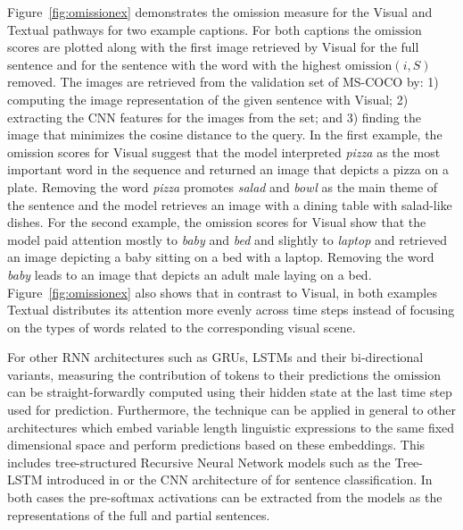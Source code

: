 \noindent Figure~\ref{fig:omissionex} demonstrates the omission
measure for the {\sc Visual} and {\sc Textual} pathways for two
example captions. For both captions the $\mathrm{omission}$ scores are
plotted along with the first image retrieved by {\sc Visual} for the
full sentence and for the sentence with the word with the highest
$\mathrm{omission}(i,S)$ removed. The images are retrieved from the
validation set of MS-COCO by: 1) computing the image representation of the 
given sentence with {\sc Visual}; 2) extracting the CNN features for the 
images from the set; and 3) finding the image that minimizes the cosine distance
to the query.\label{edit:retrievalexplain} 
In the first example, the omission
scores for {\sc Visual} suggest that the model interpreted {\it  pizza} as the most important
word in the sequence and returned an image that depicts a pizza on a plate. 
Removing the word {\it pizza} promotes {\it salad} and {\it bowl} as
the main theme of the sentence and the model retrieves an image with a dining table 
with salad-like dishes. 
For the second example, the omission scores for {\sc
  Visual} show that the model paid attention mostly to {\it baby} and
{\it bed} and slightly to {\it laptop} and retrieved an image depicting a baby 
sitting on a bed with a laptop.
Removing the word {\it baby} leads
to an image that depicts an adult male laying on a bed. Figure~\ref{fig:omissionex}
also shows that in contrast to {\sc Visual}, in both examples {\sc
  Textual} distributes its attention more evenly across time steps
instead of focusing on the types of words related to the corresponding
visual scene.


For other RNN architectures such as GRUs, LSTMs \label{edit:omitgeneral}
and their bi-directional variants, measuring the contribution
of tokens to their predictions the $\mathrm{omission}$ 
can be straight-forwardly computed using their hidden state 
at the last time step used for prediction. Furthermore, the technique 
can be applied in general to other architectures which
embed variable length linguistic expressions to the same fixed dimensional
space and perform predictions based on these embeddings. 
This includes tree-structured Recursive Neural Network models such as the Tree-LSTM
introduced in  or the CNN architecture of  
for sentence classification. In both cases the pre-softmax activations can be extracted 
from the models as the representations of the full and partial sentences.   


% 

